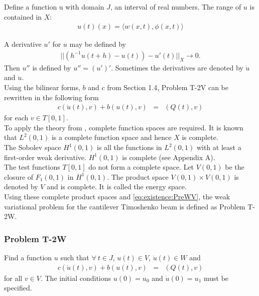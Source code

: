 \documentclass[../../main.tex]{subfiles}
\begin{document}
Define a function u with domain $J$, an interval of real numbers. The range of $u$ is contained in $X$:
\begin{eqnarray}
	u(t)(x) = \langle w(x,t), \phi(x,t) \rangle \label{def_of_u}
\end{eqnarray}

A derivative $u'$ for $u$ may be defined by
\begin{eqnarray*}
	||\left(h^{-1} u(t+h)-u(t)\right)-u'(t)||_X \rightarrow 0.
\end{eqnarray*} Then $u''$ is defined by $u'' = (u')'$. Sometimes the derivatives are denoted by $\dot{u}$ and $\ddot{u}$.\\

Using the bilinear forms, $b$ and $c$ from Section 1.4, Problem T-2V can be rewritten in the following form
\begin{eqnarray}
	c(\ddot{u}(t),v) + b(u(t),v) & = & (Q(t),v) \label{eq:existence:PreWV}
\end{eqnarray} for each $v \in T[0,1]$.\\

To apply the theory from \cite{VV02}, complete function spaces are required. It is known that $L^2(0,1)$ is a complete function space and hence $X$ is complete.\\

The Sobolev space $H^1(0,1)$ is all the functions in $L^2(0,1)$ with at least a first-order weak derivative. $H^1(0,1)$ is complete (see Appendix A).\\

The test functions $T[0,1]$ do not form a complete space. Let $V(0,1)$ be the closure of {$F_1(0,1)$} in $H^1(0,1)$. The product space {$V(0,1)\times V(0,1)$} is denoted by $V$ and is complete. It is called the energy space.\\

Using these complete product spaces and \eqref{eq:existence:PreWV}, the weak variational problem for the cantilever Timoshenko beam is defined as Problem T-2W.

\subsubsection{Problem T-2W}\label{sssec:existence:ProblemT2W}
Find a function $u$ such that $\forall \ t \in J$, $u(t) \in V$, $\ddot{u}(t) \in W$ and
\begin{eqnarray*}
	c(\ddot{u}(t),v) + b(u(t),v) & = & (Q(t),v)
\end{eqnarray*}
for all $v\in V$. The initial conditions $u(0) = u_0$ and $\dot{u}(0)=u_1$ must be specified.\\
\end{document}
